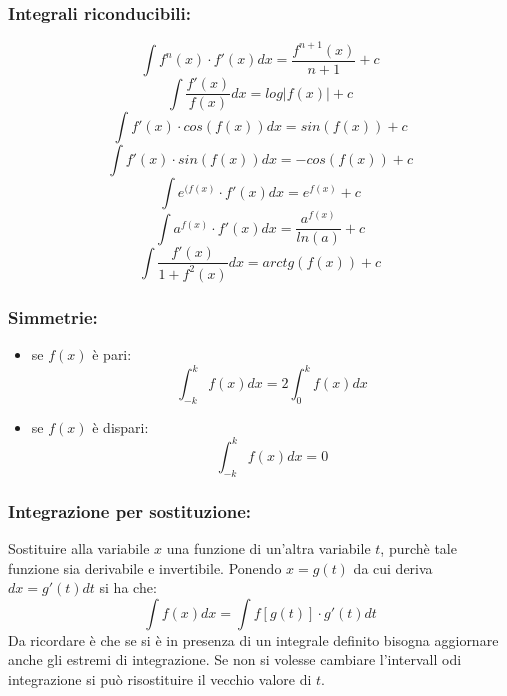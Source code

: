 \documentclass[a4paper, 9pt]{report}
\begin{document}
\subsubsection*{Integrali riconducibili:}
\[
    \int f^n(x) \cdot f'(x) dx = \frac{f^{n+1}(x)}{n+1} +c
\]
\[
    \int \frac{f'(x)}{f(x)} dx = log|f(x)|+c
\]
\[
    \int f'(x) \cdot cos(f(x)) dx =  sin(f(x))+c
\]
\[
    \int f'(x) \cdot sin(f(x)) dx = -cos(f(x)) +c
\]
\[
    \int e^{(f(x)} \cdot f'(x) dx = e^{f(x)}+c
\]
\[
    \int a^{f(x)} \cdot f'(x) dx = \frac{a^{f(x)}}{ln(a)} +c
\]
\[
    \int \frac{f'(x)}{1+f^2(x)} dx = arctg(f(x))+c
\]
\subsubsection*{Simmetrie:}
\begin{itemize}
    \item se $f(x)$ è pari:
    \[
        \int_{-k}^{k}f(x)dx = 2 \int_{0}^{k} f(x) dx
    \]
    \item se $f(x)$ è dispari:
    \[
        \int_{-k}^{k}f(x)dx = 0
    \]
\end{itemize}
\subsubsection*{Integrazione per sostituzione:}
Sostituire alla variabile $x$ una funzione di un'altra variabile $t$, purchè tale funzione sia derivabile e invertibile.\newline
Ponendo $x = g(t)$ da cui deriva $dx = g'(t) dt$ si ha che:
\[
    \int f(x) dx = \int f[g(t)] \cdot g'(t) dt
\]
Da ricordare è che se si è in presenza di un integrale definito bisogna aggiornare anche gli estremi di integrazione. Se non si volesse cambiare l'intervall odi integrazione si può risostituire il vecchio valore di $t$.
\end{document}
